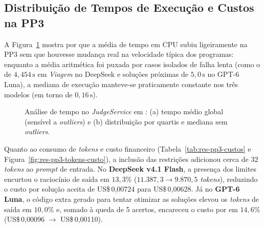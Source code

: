 \subsection{Distribuição de Tempos de Execução e Custos na PP3}\label{sec:res-rq3-custos}

A Figura~\ref{fig:res-pp3-tempo} mostra por que a média de tempo em CPU subiu ligeiramente na PP3 sem que houvesse mudança real na velocidade típica dos programas: enquanto a média aritmética foi puxada por casos isolados de falha lenta (como o  de $4{,}454\,\mathrm{s}$ em \textit{Viagem} no DeepSeek e soluções  próximas de $5{,}0\,\mathrm{s}$ no GPT-6 Luna), a mediana de execução manteve-se praticamente constante nos três modelos (em torno de $0{,}16\,\mathrm{s}$).

\begin{figure}[!htbp]
\centering

\caption[Tempos médios e distribuição de execução na PP3]{Análise de tempo no \textit{JudgeService} em : (a) tempo médio global (sensível a \textit{outliers}) e (b) distribuição por quartis e mediana sem \textit{outliers}.}
\label{fig:res-pp3-tempo}
\end{figure}
\FloatBarrier

Quanto ao consumo de \textit{tokens} e custo financeiro (Tabela~\ref{tab:res-pp3-custos} e Figura~\ref{fig:res-pp3-tokens-custo}), a inclusão das restrições adicionou cerca de 32 \textit{tokens} ao \textit{prompt} de entrada. No \textbf{DeepSeek v4.1 Flash}, a presença dos limites encurtou o raciocínio de saída em $13{,}3\%$ ($11.387{,}3 \rightarrow 9.870{,}5$ \textit{tokens}), reduzindo o custo por solução aceita de US\$\,0,00724 para US\$\,0,00628. Já no \textbf{GPT-6 Luna}, o código extra gerado para tentar otimizar as soluções elevou os \textit{tokens} de saída em $10{,}0\%$ e, somado à queda de 5 acertos, encareceu o custo por  em $14{,}6\%$ (US\$\,0,00096 $\rightarrow$ US\$\,0,00110).

